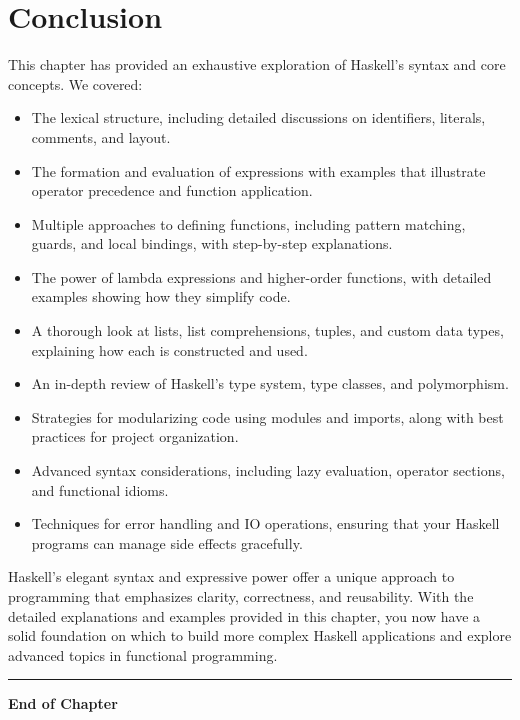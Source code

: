 \documentclass[11pt,a4paper]{article}
\begin{document}
\section{Conclusion}
This chapter has provided an exhaustive exploration of Haskell’s syntax and core concepts. We covered:
\begin{itemize}[noitemsep]
  \item The lexical structure, including detailed discussions on identifiers, literals, comments, and layout.
  \item The formation and evaluation of expressions with examples that illustrate operator precedence and function application.
  \item Multiple approaches to defining functions, including pattern matching, guards, and local bindings, with step-by-step explanations.
  \item The power of lambda expressions and higher-order functions, with detailed examples showing how they simplify code.
  \item A thorough look at lists, list comprehensions, tuples, and custom data types, explaining how each is constructed and used.
  \item An in-depth review of Haskell's type system, type classes, and polymorphism.
  \item Strategies for modularizing code using modules and imports, along with best practices for project organization.
  \item Advanced syntax considerations, including lazy evaluation, operator sections, and functional idioms.
  \item Techniques for error handling and IO operations, ensuring that your Haskell programs can manage side effects gracefully.
\end{itemize}

Haskell’s elegant syntax and expressive power offer a unique approach to programming that emphasizes clarity, correctness, and reusability. With the detailed explanations and examples provided in this chapter, you now have a solid foundation on which to build more complex Haskell applications and explore advanced topics in functional programming.

\vfill
\noindent\rule{\textwidth}{1pt}
\begin{center}
  \textbf{End of Chapter}
\end{center}
\end{document}
